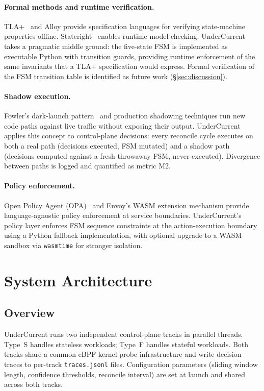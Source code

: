 \documentclass[runningheads]{llncs}
\begin{document}
\paragraph{Formal methods and runtime verification.}
TLA+~\cite{tlap} and Alloy provide specification languages for
verifying state-machine properties offline. Stateright~\cite{stateright}
enables runtime model checking. UnderCurrent takes a pragmatic middle
ground: the five-state FSM is implemented as executable Python with
transition guards, providing runtime enforcement of the same invariants
that a TLA+ specification would express. Formal verification of the FSM
transition table is identified as future work (\S\ref{sec:discussion}).

\paragraph{Shadow execution.}
Fowler's dark-launch pattern~\cite{fowler} and production shadowing
techniques run new code paths against live traffic without exposing
their output. UnderCurrent applies this concept to control-plane
decisions: every reconcile cycle executes on both a real path (decisions
executed, FSM mutated) and a shadow path (decisions computed against a
fresh throwaway FSM, never executed). Divergence between paths is logged
and quantified as metric M2.

\paragraph{Policy enforcement.}
Open Policy Agent (OPA)~\cite{opa} and Envoy's WASM extension
mechanism provide language-agnostic policy enforcement at service
boundaries. UnderCurrent's policy layer enforces FSM sequence
constraints at the action-execution boundary using a Python fallback
implementation, with optional upgrade to a WASM sandbox via
\texttt{wasmtime} for stronger isolation.

\section{System Architecture}
\label{sec:arch}

\subsection{Overview}

UnderCurrent runs two independent control-plane tracks in parallel
threads. Type~S handles stateless workloads; Type~F handles stateful
workloads. Both tracks share a common eBPF kernel probe infrastructure
and write decision traces to per-track \texttt{traces.jsonl} files.
Configuration parameters (sliding window length, confidence thresholds,
reconcile interval) are set at launch and shared across both tracks.
\end{document}
